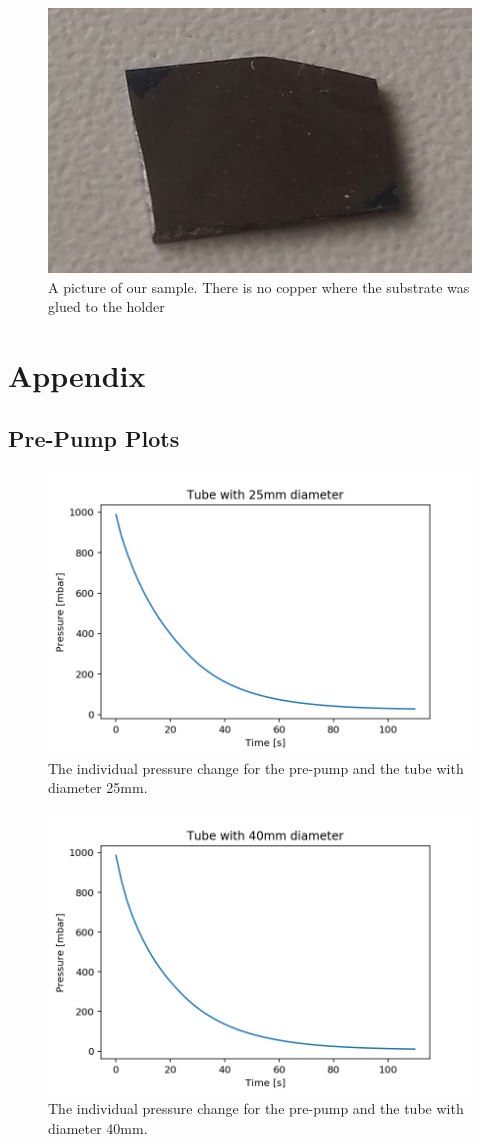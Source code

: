 \documentclass[]{article}
\begin{document}
\begin{figure}
	\centering
	\includegraphics[width=0.7\linewidth]{Bilder/sample}
	\caption{A picture of our sample. There is no copper where the substrate was glued to the holder}
	\label{fig:sample}
\end{figure}
	


\newpage

\section{Appendix}
\subsection{Pre-Pump Plots}
\label{Pre-Pump Plots}

\begin{figure}[!h]
\centering\includegraphics[width=.5\textwidth]{Plots/25mm.png}
\caption{The individual pressure change for the pre-pump and the tube with diameter 25mm.}
\label{fig::25mm}
\end{figure}

\begin{figure}[!h]
\centering\includegraphics[width=.5\textwidth]{Plots/40mm.png}
\caption{The individual pressure change for the pre-pump and the tube with diameter 40mm.}
\label{fig::40mm}
\end{figure}
\end{document}
